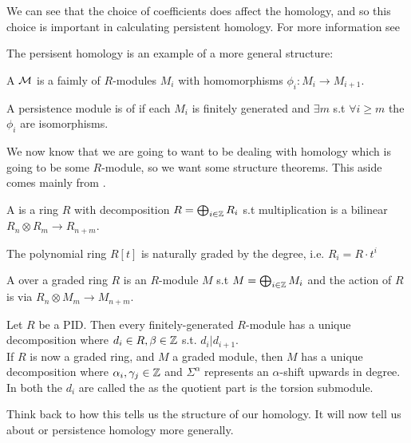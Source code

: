 \documentclass{article}
\begin{document}
\begin{aside}
\begin{remark}
	We can see that the choice of coefficients does affect the homology, and so this choice is important in calculating persistent homology. For more information see \cite{obayashi2019}
\end{remark}

\end{aside}

The persisent homology is an example of a more general structure:

\begin{definition}
	A  $\mathcal{M}$ is a faimly of $R$-modules $M_i$ with homomorphisms $\phi_i : M_i \to M_{i+1}$. 
\end{definition}

\begin{definition}
	A persistence module is of  if each $M_i$ is finitely generated and $\exists m$ s.t $\forall i \geq m$ the $\phi_i$ are isomorphisms.  
\end{definition}

\begin{aside}
	We now know that we are going to want to be dealing with homology which is going to be some $R$-module, so we want some structure theorems. This aside comes mainly from \cite{Zomorodian2005}.
	
	\begin{definition}
		A  is a ring $R$ with decomposition $R = \bigoplus_{i \in \mathbb{Z}} R_i$ s.t multiplication is a bilinear $R_n \otimes R_m \to R_{n+m}$.
	\end{definition}

\begin{example}
	The polynomial ring $R[t]$ is naturally graded by the degree, i.e. $R_i = R\cdot t^i$
\end{example}

\begin{definition}
	A  over a graded ring $R$ is an $R$-module $M$ s.t $M = \bigoplus_{i \in \mathbb{Z}} M_i$ and the action of $R$ is via $R_n \otimes M_m \to M_{n+m}$. 
\end{definition}

\begin{theorem}
	Let $R$ be a PID. Then every finitely-generated $R$-module has a unique decomposition 
where $d_i \in R, \beta \in \mathbb{Z}$ s.t. $d_i | d_{i+1}$. \\
If $R$ is now a graded ring, and $M$ a graded module, then $M$ has a unique decomposition 
where $\alpha_i,\gamma_j \in \mathbb{Z}$ and $\Sigma^\alpha$ represents an $\alpha$-shift upwards in degree. \\
In both the $d_i$ are called the  as the quotient part is the torsion submodule. 
\end{theorem}
Think back to how this tells us the structure of our homology. It will now tell us about or persistence homology more generally. 
\end{aside}
\end{document}
